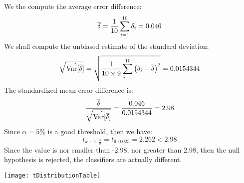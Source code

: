 We the compute the average error difference:
\[\overline{\delta}=\frac{1}{10}\displaystyle\sum_{i=1}^{10}\delta_i=0.046\]
We shall compute the unbiased estimate of the standard deviation:
\[\sqrt{\tilde{\text{Var}[\overline{\delta}]}}=\sqrt{\frac{1}{10\times 9}\displaystyle\sum_{i=1}^{10}\left(\delta_i-\overline{\delta}\right)^2}=0.0154344\]
The standardized mean error difference is:
\[\frac{\overline{\delta}}{\sqrt{\tilde{\text{Var}[\overline{\delta}]}}}=\frac{0.046}{0.0154344}=2.98\]
Since $\alpha=5\%$ is a good threshold, then we have:
\[t_{k-1,\frac{\alpha}{2}}=t_{9,0.025}=2.262<2.98\]
Since the value is nor smaller than -2.98, nor greater than 2.98, then the null hypothesis is rejected, the classifiers are actually different. 
\begin{center}
  \texttt{[image: tDistributionTable]}
\end{center}





